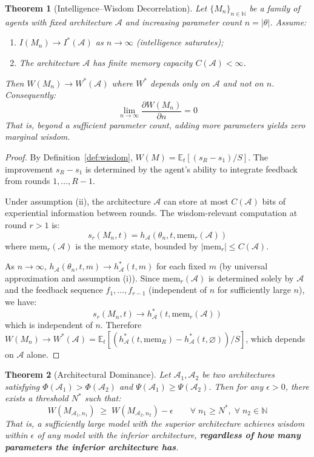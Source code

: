 \documentclass{article}
\newtheorem{theorem}{Theorem}
\newcommand{\cA}{\mathcal{A}}
\newcommand{\E}{\mathbb{E}}
\newcommand{\N}{\mathbb{N}}
\begin{document}
\begin{theorem}[Intelligence--Wisdom Decorrelation]
\label{thm:decorrelation}
Let $\{M_n\}_{n \in \N}$ be a family of agents with fixed architecture $\cA$ and increasing parameter count $n = |\theta|$.
Assume:
\begin{enumerate}[label=(\roman*),itemsep=1pt]
    \item $I(M_n) \to I^*(\cA)$ as $n \to \infty$ (intelligence saturates);
    \item The architecture $\cA$ has finite memory capacity $C(\cA) < \infty$.
\end{enumerate}
Then $W(M_n) \to W^*(\cA)$ where $W^*$ depends only on $\cA$ and not on $n$.
Consequently:
\begin{equation}
    \lim_{n \to \infty} \frac{\partial W(M_n)}{\partial n} = 0
\end{equation}
That is, beyond a sufficient parameter count, adding more parameters yields zero marginal wisdom.
\end{theorem}

\begin{proof}
By Definition~\ref{def:wisdom}, $W(M) = \E_t[(s_R - s_1)/S]$.
The improvement $s_R - s_1$ is determined by the agent's ability to integrate feedback from rounds $1, \ldots, R-1$.

Under assumption (ii), the architecture $\cA$ can store at most $C(\cA)$ bits of experiential information between rounds.
The wisdom-relevant computation at round $r > 1$ is:
\[
    s_r(M_n, t) = h_\cA\!\left(\theta_n, t, \text{mem}_r(\cA)\right)
\]
where $\text{mem}_r(\cA)$ is the memory state, bounded by $|\text{mem}_r| \leq C(\cA)$.

As $n \to \infty$, $h_\cA(\theta_n, t, m) \to h^*_\cA(t, m)$ for each fixed $m$ (by universal approximation and assumption (i)).
Since $\text{mem}_r(\cA)$ is determined solely by $\cA$ and the feedback sequence $f_1, \ldots, f_{r-1}$ (independent of $n$ for sufficiently large $n$), we have:
\[
    s_r(M_n, t) \to h^*_\cA(t, \text{mem}_r(\cA))
\]
which is independent of $n$.
Therefore $W(M_n) \to W^*(\cA) = \E_t[(h^*_\cA(t, \text{mem}_R) - h^*_\cA(t, \varnothing))/S]$, which depends on $\cA$ alone.
\end{proof}

\begin{theorem}[Architectural Dominance]
\label{thm:dominance}
Let $\cA_1, \cA_2$ be two architectures satisfying $\Phi(\cA_1) > \Phi(\cA_2)$ and $\Psi(\cA_1) \geq \Psi(\cA_2)$.
Then for any $\epsilon > 0$, there exists a threshold $N^*$ such that:
\[
    W(M_{\cA_1, n_1}) \;\geq\; W(M_{\cA_2, n_2}) - \epsilon \qquad \forall\; n_1 \geq N^*,\; \forall\; n_2 \in \N
\]
That is, a sufficiently large model with the superior architecture achieves wisdom within $\epsilon$ of any model with the inferior architecture, \textbf{regardless of how many parameters the inferior architecture has}.
\end{theorem}
\end{document}
